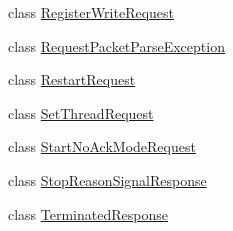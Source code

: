 \begin{DoxyCompactItemize}
\item 
class \mbox{\hyperlink{classxd_1_1dbg_1_1gdbstub_1_1pkt_1_1_register_write_request}{Register\+Write\+Request}}
\item 
class \mbox{\hyperlink{classxd_1_1dbg_1_1gdbstub_1_1pkt_1_1_request_packet_parse_exception}{Request\+Packet\+Parse\+Exception}}
\item 
class \mbox{\hyperlink{classxd_1_1dbg_1_1gdbstub_1_1pkt_1_1_restart_request}{Restart\+Request}}
\item 
class \mbox{\hyperlink{classxd_1_1dbg_1_1gdbstub_1_1pkt_1_1_set_thread_request}{Set\+Thread\+Request}}
\item 
class \mbox{\hyperlink{classxd_1_1dbg_1_1gdbstub_1_1pkt_1_1_start_no_ack_mode_request}{Start\+No\+Ack\+Mode\+Request}}
\item 
class \mbox{\hyperlink{classxd_1_1dbg_1_1gdbstub_1_1pkt_1_1_stop_reason_signal_response}{Stop\+Reason\+Signal\+Response}}
\item 
class \mbox{\hyperlink{classxd_1_1dbg_1_1gdbstub_1_1pkt_1_1_terminated_response}{Terminated\+Response}}
\end{DoxyCompactItemize}

